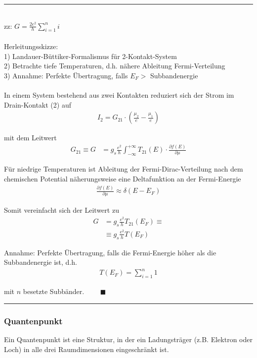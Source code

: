 \documentclass{article}
\newcommand{\lr}[1]{\left(#1\right)}
\begin{document}
\newpage


{\color{violet}
\hrule
	\\
	zz: $G = \frac{2e^2}{h} \sum_{i=1}^n i$\\
	\\
	Herleitungsskizze:\\
	1) Landauer-Büttiker-Formalismus für 2-Kontakt-System \\
	2) Betrachte tiefe Temperaturen, d.h. nähere Ableitung Fermi-Verteilung \\
	3) Annahme: Perfekte Übertragung, falls $E_F >$ Subbandenergie \\
	\\
	In einem System bestehend aus zwei Kontakten reduziert sich der Strom im Drain-Kontakt (2) auf
		\begin{align*}
			I_2 = G_{21} \cdot \lr{ \frac{\mu_2}{e} - \frac{\mu_1}{e} }
		\end{align*}
	
	mit dem Leitwert
		\begin{align*}
			G_{21} \equiv G &= g_s\frac{e^2}{h} \int_{-\infty}^{+\infty} T_{21}(E) \cdot \frac{\partial f(E)}{\partial \mu}
		\end{align*}

	Für niedrige Temperaturen ist Ableitung der Fermi-Dirac-Verteilung nach dem chemischen Potential näherungsweise eine Deltafunktion an der Fermi-Energie
		\begin{align*}
			\frac{\partial f(E)}{\partial \mu} \approx \delta(E-E_F)
		\end{align*}
	
	Somit vereinfacht sich der Leitwert zu
		\begin{align*}
			G &= g_s \frac{e^2}{h} T_{21}(E_F) \equiv \\
			&\equiv g_s \frac{e^2}{h} T(E_F)
		\end{align*}

	Annahme: Perfekte Übertragung, falls die Fermi-Energie höher als die Subbandenergie ist, d.h.
		\begin{align*}
			T(E_F) = \sum_{i=1}^n 1
		\end{align*}
	
	mit $n$ besetzte Subbänder. $\qquad \blacksquare$

\hrule
}


\newpage


\subsubsection{Quantenpunkt}
Ein Quantenpunkt ist eine Struktur, in der ein Ladungsträger (z.B. Elektron oder Loch) in alle drei Raumdimensionen eingeschränkt ist.
\end{document}
